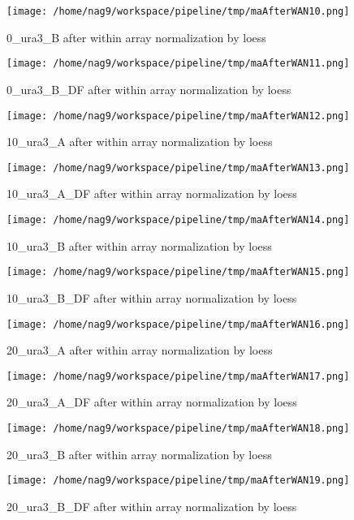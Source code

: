 \documentclass[titlepage]{article}
\begin{document}
\begin{figure}[htb!]
\centering\texttt{[image: /home/nag9/workspace/pipeline/tmp/maAfterWAN10.png]}
\caption{0\_ura3\_B after within array normalization by loess}
 \end{figure}\pagebreak
\begin{figure}[htb!]
\centering\texttt{[image: /home/nag9/workspace/pipeline/tmp/maAfterWAN11.png]}
\caption{0\_ura3\_B\_DF after within array normalization by loess}
 \end{figure}\pagebreak
\begin{figure}[htb!]
\centering\texttt{[image: /home/nag9/workspace/pipeline/tmp/maAfterWAN12.png]}
\caption{10\_ura3\_A after within array normalization by loess}
 \end{figure}\pagebreak
\begin{figure}[htb!]
\centering\texttt{[image: /home/nag9/workspace/pipeline/tmp/maAfterWAN13.png]}
\caption{10\_ura3\_A\_DF after within array normalization by loess}
 \end{figure}\pagebreak
\begin{figure}[htb!]
\centering\texttt{[image: /home/nag9/workspace/pipeline/tmp/maAfterWAN14.png]}
\caption{10\_ura3\_B after within array normalization by loess}
 \end{figure}\pagebreak
\begin{figure}[htb!]
\centering\texttt{[image: /home/nag9/workspace/pipeline/tmp/maAfterWAN15.png]}
\caption{10\_ura3\_B\_DF after within array normalization by loess}
 \end{figure}\pagebreak
\begin{figure}[htb!]
\centering\texttt{[image: /home/nag9/workspace/pipeline/tmp/maAfterWAN16.png]}
\caption{20\_ura3\_A after within array normalization by loess}
 \end{figure}\pagebreak
\begin{figure}[htb!]
\centering\texttt{[image: /home/nag9/workspace/pipeline/tmp/maAfterWAN17.png]}
\caption{20\_ura3\_A\_DF after within array normalization by loess}
 \end{figure}\pagebreak
\begin{figure}[htb!]
\centering\texttt{[image: /home/nag9/workspace/pipeline/tmp/maAfterWAN18.png]}
\caption{20\_ura3\_B after within array normalization by loess}
 \end{figure}\pagebreak
\begin{figure}[htb!]
\centering\texttt{[image: /home/nag9/workspace/pipeline/tmp/maAfterWAN19.png]}
\caption{20\_ura3\_B\_DF after within array normalization by loess}
 \end{figure}\pagebreak
\end{document}
